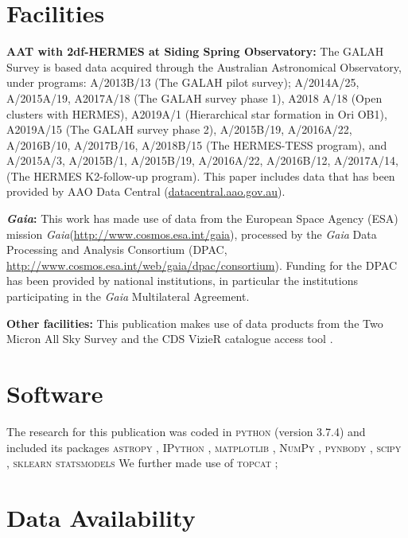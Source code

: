 \documentclass[fleqn,usenatbib]{mnras}
\newcommand{\Gaia}{\textit{Gaia}\xspace} %
\begin{document}
\section*{Facilities}

\textbf{AAT with 2df-HERMES at Siding Spring Observatory:} The GALAH Survey is based data acquired through the Australian Astronomical Observatory, under programs: A/2013B/13 (The GALAH pilot survey); A/2014A/25, A/2015A/19, A2017A/18 (The GALAH survey phase 1), A2018 A/18 (Open clusters with HERMES), A2019A/1 (Hierarchical star formation in Ori OB1), A2019A/15 (The GALAH survey phase 2), A/2015B/19, A/2016A/22, A/2016B/10, A/2017B/16, A/2018B/15 (The HERMES-TESS program), and A/2015A/3, A/2015B/1, A/2015B/19, A/2016A/22, A/2016B/12, A/2017A/14, (The HERMES K2-follow-up program). This paper includes data that has been provided by AAO Data Central (\url{datacentral.aao.gov.au}).

\textbf{\Gaia: } This work has made use of data from the European Space Agency (ESA) mission \Gaia (\url{http://www.cosmos.esa.int/gaia}), processed by the \Gaia Data Processing and Analysis Consortium (DPAC, \url{http://www.cosmos.esa.int/web/gaia/dpac/consortium}). Funding for the DPAC has been provided by national institutions, in particular the institutions participating in the \Gaia Multilateral Agreement. 

\textbf{Other facilities:} This publication makes use of data products from the Two Micron All Sky Survey \citep{Skrutskie2006} and the CDS VizieR catalogue access tool \citep{Vizier2000}.

\section*{Software}

The research for this publication was coded in \textsc{python} (version 3.7.4) and included its packages
\textsc{astropy} \citep[v. 3.2.2;][]{Robitaille2013,PriceWhelan2018},
\textsc{IPython} \citep[v. 7.8.0;][]{ipython},
\textsc{matplotlib} \citep[v. 3.1.3;][]{matplotlib},
\textsc{NumPy} \citep[v. 1.17.2;][]{numpy},
\textsc{pynbody} \citep[v. 1.1.0;][]{pynbody},
\textsc{scipy} \citep[v. 1.3.1;][]{Scipy},
\textsc{sklearn} \citep[v. 1.5.1][]{scikit-learn}
\textsc{statsmodels} \citep[v. 0.14.2][]{statsmodels}
We further made use of \textsc{topcat} \citep[version 4.7;][]{Taylor2005};

\section*{Data Availability}
\end{document}
